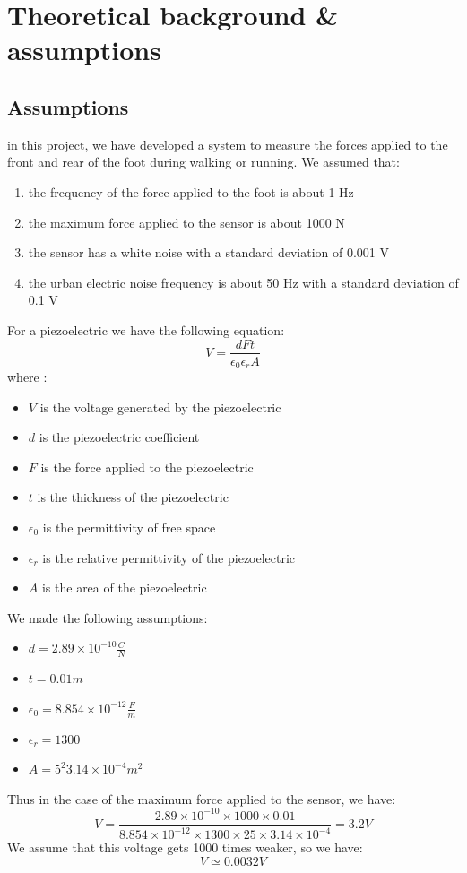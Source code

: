 \section{Theoretical background \& assumptions} \label{section: theoretical background}
\subsection{Assumptions}
in this project, we have developed a system to measure the forces applied to the front and rear of the foot during walking or running. We assumed that:
\begin{enumerate}
    \item the frequency of the force applied to the foot is about 1 Hz
    \item the maximum force applied to the sensor is about 1000 N
    \item the sensor has a white noise with a standard deviation of 0.001 V
    \item the urban electric noise frequency is about 50 Hz with a standard deviation of 0.1 V
\end{enumerate}
For a piezoelectric we have the following equation:
\begin{equation}
    V = \frac{dFt}{\epsilon_{0}\epsilon_{r}A}
\end{equation}
where :
\begin{itemize}
    \item $V$ is the voltage generated by the piezoelectric
    \item $d$ is the piezoelectric coefficient
    \item $F$ is the force applied to the piezoelectric
    \item $t$ is the thickness of the piezoelectric
    \item $\epsilon_{0}$ is the permittivity of free space
    \item $\epsilon_{r}$ is the relative permittivity of the piezoelectric
    \item $A$ is the area of the piezoelectric
\end{itemize}
We made the following assumptions:
\begin{itemize}
    \item $d = 2.89 \times 10^{-10} \frac{C}{N}$
    \item $t = 0.01 m$
    \item $\epsilon_{0} = 8.854 \times 10^{-12} \frac{F}{m}$
    \item $\epsilon_{r} = 1300$
    \item $A = 5^2 3.14 \times 10^{-4} m^{2}$
\end{itemize}
Thus in the case of the maximum force applied to the sensor, we have:
\begin{equation}
    V = \frac{2.89 \times 10^{-10} \times 1000 \times 0.01}{8.854 \times 10^{-12} \times 1300 \times 25 \times 3.14 \times 10^{-4}} = 3.2 V
\end{equation}
We assume that this voltage gets 1000 times weaker, so we have:
\begin{equation}
    V \simeq 0.0032 V
\end{equation}

